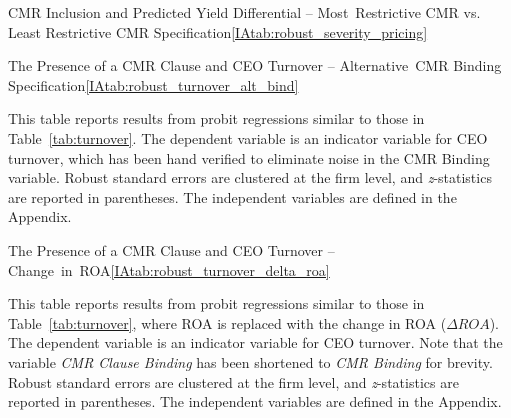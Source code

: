 \documentclass[12pt]{article}
\begin{document}
\begin{appendices}
\begin{singlespace}
\begin{papertable}{CMR Inclusion and Predicted Yield Differential -- Most~Restrictive CMR vs. Least Restrictive CMR Specification}{\ref{IAtab:robust_severity_pricing}}{}
    \startdata
    

\end{papertable}





\begin{papertable}{The Presence of a CMR Clause and CEO Turnover -- Alternative~CMR Binding Specification}{\ref{IAtab:robust_turnover_alt_bind}}{}
  \label{IAtab:robust_turnover_alt_bind}

  This table reports results from probit regressions similar to those in Table~\ref{tab:turnover}.
  The dependent variable is an indicator variable for CEO turnover, which has been hand verified to eliminate noise in the CMR Binding variable.
  Robust standard errors are clustered at the firm level, and \textit{z}-statistics are reported in parentheses.
  The independent variables are defined in the Appendix.
  \postamblesig

  \startdata
  

\end{papertable}



\begin{papertable}{The Presence of a CMR Clause and CEO Turnover -- Change~in~ROA}{\ref{IAtab:robust_turnover_delta_roa}}{}
  \label{IAtab:robust_turnover_delta_roa}

  This table reports results from probit regressions similar to those in Table~\ref{tab:turnover}, where ROA is replaced with the change in ROA ($\Delta ROA$).
  The dependent variable is an indicator variable for CEO turnover.
  Note that the variable \textit{CMR Clause Binding} has been shortened to \textit{CMR Binding} for brevity.
  Robust standard errors are clustered at the firm level, and \textit{z}-statistics are reported in parentheses.
  The independent variables are defined in the Appendix.
  \postamblesig

  \startdata
  


\end{papertable}
\end{singlespace}
\end{appendices}
\end{document}
